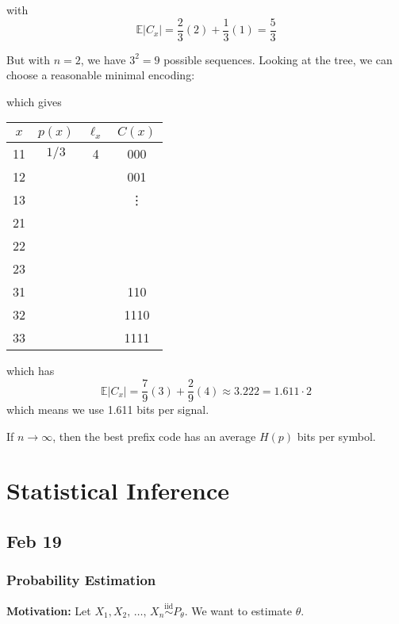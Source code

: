 \documentclass[12pt]{report}
\newcommand{\E}{\mathbb{E}}
\newcommand{\abs}[1]{\left\vert #1 \right\vert}
\newcommand{\iid}{\overset{\text{iid}}{\sim}}
\newcommand*{\tbf}[1]{\ifmmode\mathbf{#1}\else\textbf{#1}\fi}
\begin{document}
with
\[\E\abs{C_x} = \frac{2}{3}(2) + \frac{1}{3}(1) = \frac{5}{3}\]

But with $n=2$, we have $3^2 = 9$ possible sequences. Looking at the tree, we can choose a reasonable minimal encoding:

\begin{center}
\end{center}

which gives
\qquad \begin{tabular}{cccc}
	$x$ & $p(x)$ & $\ell_x$ & $C(x)$ \\\hline
	11  & $1/3$  & 4        & 000    \\
	12  &        &          & 001    \\
	13  &        &          & \vdots \\
	21                               \\
	22                               \\
	23                               \\
	31  &        &          & 110    \\
	32  &        &          & 1110   \\
	33  &        &          & 1111
\end{tabular}

which has
\[\E\abs{C_x} = \frac{7}{9}(3) + \frac{2}{9}(4) \approx 3.222 = 1.611 \cdot 2\]
which means we use 1.611 bits per signal.

If $n \to \infty$, then the best prefix code has an average $H(p)$ bits per symbol.

\chapter{Statistical Inference}
\section{Feb 19}
\subsection{Probability Estimation}
\tbf{Motivation:} Let $X_1, X_2, \, \dots,\, X_n \iid P_{\theta}$. We want to estimate $\theta$.
\end{document}
